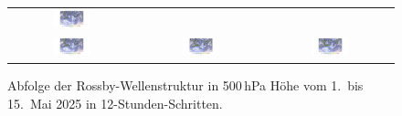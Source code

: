 \begin{figure}
\begin{tabular}{ccc}
		\includegraphics[width=0.32\textwidth, trim=5.75cm 3cm 5cm 0.9cm, clip]{papers/rossby/images/weather/data_2025_5_3_12:00_500.pdf}   \\
		\includegraphics[width=0.32\textwidth, trim=5.75cm 3cm 5cm 0.9cm, clip]{papers/rossby/images/weather/data_2025_5_4_00:00_500.pdf} &
		\includegraphics[width=0.32\textwidth, trim=5.75cm 3cm 5cm 0.9cm, clip]{papers/rossby/images/weather/data_2025_5_4_12:00_500.pdf} &
		\includegraphics[width=0.32\textwidth, trim=5.75cm 3cm 5cm 0.9cm, clip]{papers/rossby/images/weather/data_2025_5_5_00:00_500.pdf}   \\
	\end{tabular}
	\caption{Abfolge der Rossby-Wellenstruktur in 500\,hPa Höhe vom 1.\ bis 15.\ Mai 2025 in 12-Stunden-Schritten.}
	\label{fig:rossby_grid}
\end{figure}

